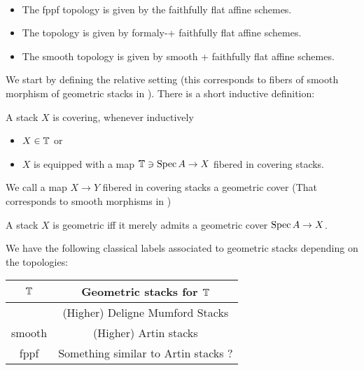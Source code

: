 \documentclass{article}
\begin{document}
	\begin{example}
		\ \begin{itemize}
			\item 
			The fppf topology is given by the faithfully flat affine schemes. 
			\item The \etale topology is given by formaly-\etale + faithfully flat affine schemes. \\
			\item The smooth topology is given by smooth + faithfully flat affine schemes.
		\end{itemize}
	\end{example}
	
	\newpage
	We start by defining the relative setting (this corresponds to fibers of smooth morphism of geometric stacks in \cite{simpson1996algebraicgeometricnstacks}). There is a short inductive definition:
	\begin{definition}
		A stack $X$ is covering, whenever inductively
		\begin{itemize}
			\item $X \in \mathbb{T}$ or
			\item $X$ is equipped with a map $\mathbb{T} \ni \operatorname{Spec} A \to X$ fibered in covering stacks.
		\end{itemize}
		
	\end{definition}
	We call a map $X \to Y$ fibered in covering stacks a geometric cover (That corresponds to smooth morphisms in \cite{simpson1996algebraicgeometricnstacks}) 
	\begin{definition}
		A stack $X$ is geometric iff it merely admits a geometric cover $\operatorname{Spec} A \to X$.
	\end{definition}
	We have the following classical labels associated to geometric stacks depending on the topologies:
	\begin{tabular}{c|c}
		$\mathbb{T}$ & Geometric stacks for $\mathbb{T}$ \\
		\hline 
		\etale & (Higher) Deligne Mumford Stacks  \\
		smooth & (Higher) Artin stacks \\    
		fppf & Something similar to Artin stacks ?     
	\end{tabular}
	
\end{document}
